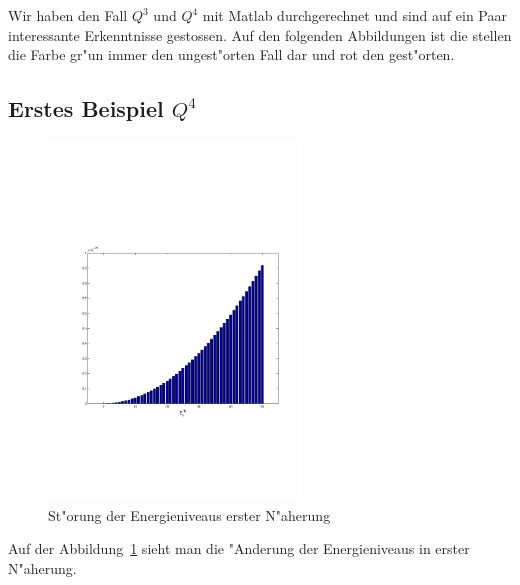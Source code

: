 \begin{refsection}
Wir haben den Fall $Q^3$ und $Q^4$ mit Matlab durchgerechnet und sind auf ein Paar interessante Erkenntnisse gestossen. Auf den folgenden Abbildungen ist die stellen die Farbe gr"un immer den ungest"orten Fall dar und rot den gest"orten.

\subsection{Erstes Beispiel $Q^4$}

\begin{figure}	%
\centering
\includegraphics[width=0.6\textwidth]{anharmonisch/images/x4/EK1.pdf}
\caption{St"orung der Energieniveaus erster N"aherung
\label{skript:x4_EK1}}
\end{figure}

Auf der Abbildung~\ref{skript:x4_EK1} sieht man die "Anderung der Energieniveaus in erster N"aherung. 


\end{refsection}
